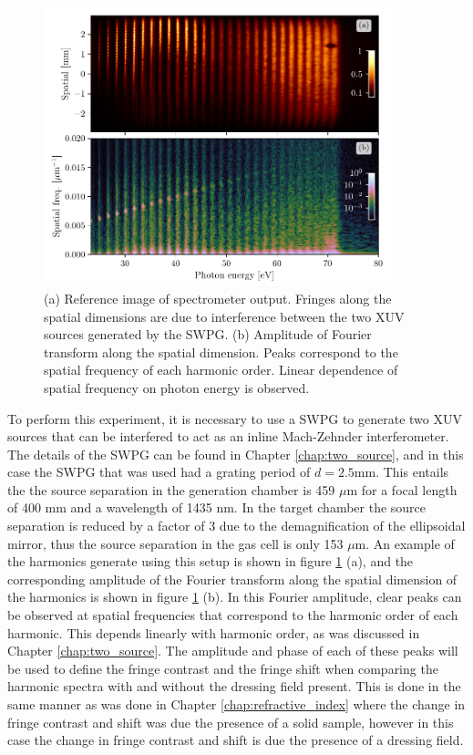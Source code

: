 \begin{figure}
	\centering
	\includegraphics[width=0.9\textwidth]{figures/CATS/ref_image_FFT.pdf}
	\caption[Reference camera image and spatial Fourier transform used in CATS]{(a) Reference image of spectrometer output.  Fringes along the spatial dimensions are due to interference between the two XUV sources generated by the SWPG. (b) Amplitude of Fourier transform along the spatial dimension. Peaks correspond to the spatial frequency of each harmonic order.  Linear dependence of spatial frequency on photon energy is observed.}
	\label{fig:ref_image_FFT}
\end{figure}

To perform this experiment, it is necessary to use a SWPG to generate two XUV sources that can be interfered to act as an inline Mach-Zehnder interferometer.  The details of the SWPG can be found in Chapter \ref{chap:two_source}, and in this case the SWPG that was used had a grating period of $d=2.5$mm.  This entails the the source separation in the generation chamber is 459 $\mu$m for a focal length of 400 mm and a wavelength of 1435 nm.  In the target chamber the source separation is reduced by a factor of 3 due to the demagnification of the ellipsoidal mirror, thus the source separation in the gas cell is only 153 $\mu$m.  An example of the harmonics generate using this setup is shown in figure \ref{fig:ref_image_FFT} (a), and the corresponding amplitude of the Fourier transform along the spatial dimension of the harmonics is shown in figure \ref{fig:ref_image_FFT} (b).  In this Fourier amplitude, clear peaks can be observed at spatial frequencies that correspond to the harmonic order of each harmonic.  This depends linearly with harmonic order, as was discussed in Chapter \ref{chap:two_source}.  The amplitude and phase of each of these peaks will be used to define the fringe contrast and the fringe shift when comparing the harmonic spectra with and without the dressing field present.  This is done in the same manner as was done in Chapter \ref{chap:refractive_index} where the change in fringe contrast and shift was due the presence of a solid sample, however in this case the change in fringe contrast and shift is due the presence of a dressing field. 

